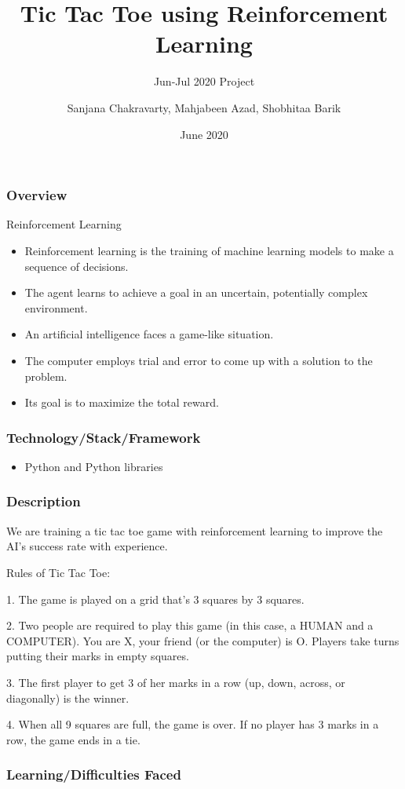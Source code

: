\documentclass{beamer}
\title{Tic Tac Toe using Reinforcement Learning}
\subtitle{Jun-Jul 2020 Project}
\author[Group 12]{Sanjana Chakravarty, Mahjabeen Azad, Shobhitaa Barik}
\date{June 2020}
\begin{document}
\begin{frame}
    \titlepage
\end{frame}

\begin{frame}
    \frametitle{Overview}
    \begin{block}{Reinforcement Learning}        
        \begin{itemize}
            \item<1-> Reinforcement learning is the training of machine learning models to make a sequence of decisions.
            \item<2-> The agent learns to achieve a goal in an uncertain, potentially complex environment.
            \item<3-> An artificial intelligence faces a game-like situation.
            \item<4-> The computer employs trial and error to come up with a solution to the problem.
            \item<5-> Its goal is to maximize the total reward.
        \end{itemize}
    \end{block}
\end{frame}

\begin{frame}
    \frametitle{Technology/Stack/Framework}
        \begin{itemize}
            \item<1-> Python and Python libraries
         \end{itemize}
\end{frame}

\begin{frame}
    \frametitle{Description}
     We are training a tic tac toe game with reinforcement learning to improve the AI’s success rate with experience.
     
     Rules of Tic Tac Toe:
     
     1. The game is played on a grid that's 3 squares by 3 squares.


     2. Two people are required to play this game (in this case, a HUMAN and a COMPUTER). You are X, your friend (or the computer) is O. Players take turns putting their marks in empty squares.


     3. The first player to get 3 of her marks in a row (up, down, across, or diagonally) is the winner.


     4. When all 9 squares are full, the game is over. If no player has 3 marks in a row, the game ends in a tie.
\end{frame}

\begin{frame}
    \frametitle{Learning/Difficulties Faced}
\end{frame}
\end{document}
